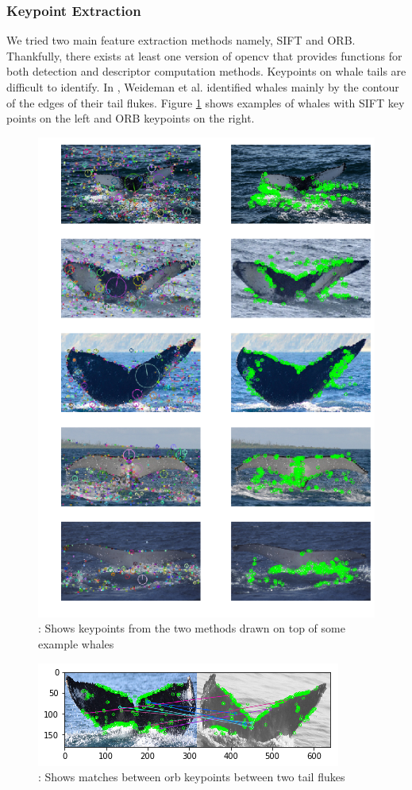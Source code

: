 \subsubsection{Keypoint Extraction}

We tried two main feature extraction methods namely, SIFT and ORB. Thankfully, there exists at least one version of opencv that provides functions for both detection and descriptor computation methods. Keypoints on whale tails are difficult to identify. In \cite{weideman2017integral}, Weideman et al. identified whales mainly by the contour of the edges of their tail flukes. Figure \ref{fig:whalekp} shows examples of whales with SIFT key points on the left and ORB keypoints on the right.

\begin{figure}[ht]
	\centering
	\includegraphics[width=.5\linewidth]{images/kp_side_by_side.png}
	\caption{\label{fig:whalekp}: Shows keypoints from the two methods drawn on top of some example whales}
\end{figure}
\begin{figure}[ht]
	\centering
	\includegraphics[width=.8\linewidth]{images/orb_matches.png}
	\caption{\label{fig:orbmatch}: Shows matches between orb keypoints between two tail flukes}
\end{figure}

